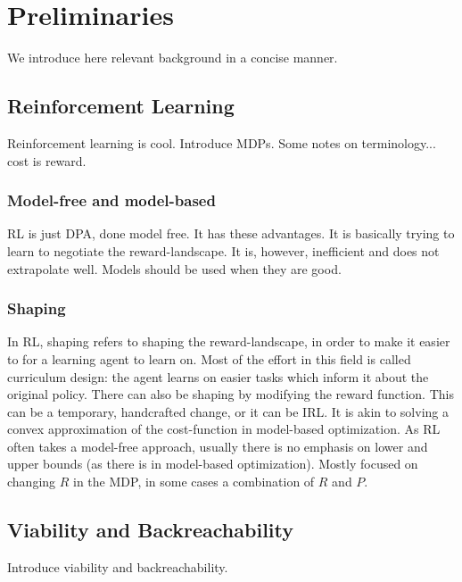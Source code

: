 
\chapter{Preliminaries}
We introduce here relevant background in a concise manner.

\section{Reinforcement Learning}
Reinforcement learning is cool. Introduce MDPs. Some notes on terminology... cost is reward.
\subsection{Model-free and model-based}
RL is just DPA, done model free. It has these advantages. It is basically trying to learn to negotiate the reward-landscape. It is, however, inefficient and does not extrapolate well. Models should be used when they are good.
\subsection{Shaping}
In RL, shaping refers to shaping the reward-landscape, in order to make it easier to for a learning agent to learn on.
Most of the effort in this field is called curriculum design: the agent learns on easier tasks which inform it about the original policy.
There can also be shaping by modifying the reward function. This can be a temporary, handcrafted change, or it can be IRL.
It is akin to solving a convex approximation of the cost-function in model-based optimization. As RL often takes a model-free approach, usually there is no emphasis on lower and upper bounds (as there is in model-based optimization).
Mostly focused on changing $R$ in the MDP, in some cases a combination of $R$ and $P$.


\section{Viability and Backreachability}
Introduce viability and backreachability.